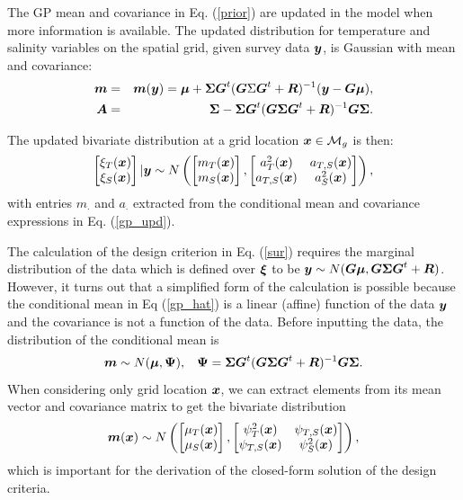 \documentclass[aoas]{imsart}
\begin{document}
The GP mean and covariance in Eq. (\ref{prior}) are updated in the model when more information is available. The
updated distribution for temperature and salinity variables on the
spatial grid, given survey data ${\boldsymbol y}$, is Gaussian with mean and
covariance: 
\begin{eqnarray}\label{gp_upd}
  \bm &=& \bm(\by) = \bmu+\bSigma \bG^t (\bG \Sigma \bG^t+\bR)^{-1}(\by-\bG \bmu),  \\
  \bA &=& \bSigma - \bSigma \bG^t (\bG \bSigma \bG^t+\bR)^{-1} \bG
          \bSigma.\nonumber
\end{eqnarray}

The updated bivariate distribution at a grid location ${\boldsymbol x} \in
\mathcal{M}_g$ is then: 
\begin{equation}\label{gp_hat}
\begin{bmatrix}
\xi_T(\bx) \\
\xi_S(\bx)
\end{bmatrix}
 |\by
 \sim N \left( 
\begin{bmatrix} m_{T}(\bx)\\
m_{S}(\bx)
\end{bmatrix},\begin{bmatrix}
a_{T}^2(\bx) & a_{T,S}(\bx)  \\
a_{T,S}(\bx)  & a_{S}^2(\bx)  
\end{bmatrix}
\right),
\end{equation}
with entries $m_{\cdot}$ and $a_{\cdot}$ extracted from the conditional mean and covariance
expressions in Eq. (\ref{gp_upd}).

The calculation of the design criterion in Eq. (\ref{sur}) requires
the marginal distribution of the data which is defined over ${\boldsymbol \xi}$ to
be ${\boldsymbol y} \sim N( {\boldsymbol G} {\boldsymbol \mu},{\boldsymbol G} {\boldsymbol \Sigma} {\boldsymbol G}^t+{\boldsymbol R})$.  However, it turns
out that a simplified form of the calculation is possible because the
conditional mean in Eq (\ref{gp_hat}) is a linear (affine) function of
the data ${\boldsymbol y}$ and the covariance is not a function of the data.
Before inputting the data, the distribution of the conditional mean is
\begin{equation}\label{distxi} \bm \sim N(\bmu , \bPsi), \hspace{3mm}
  \bPsi=\bSigma \bG^t (\bG \bSigma \bG^t+\bR)^{-1} \bG \bSigma.
\end{equation} 
When considering only grid location ${\boldsymbol x}$, we can
extract elements from its mean vector and covariance matrix to get the
bivariate distribution \begin{equation}\label{dist_mxi} 
  \bm(\bx) \sim N \left( \begin{bmatrix}
      \mu_{T}(\bx) \\
      \mu_{S}(\bx) \end{bmatrix}, \begin{bmatrix}
      \psi^2_{T}(\bx) & \psi_{T,S}(\bx)\\
      \psi_{T,S}(\bx) & \psi^2_{S}(\bx) \end{bmatrix} \right),
\end{equation}
which is important for the derivation of the closed-form solution of the design criteria.
\end{document}
